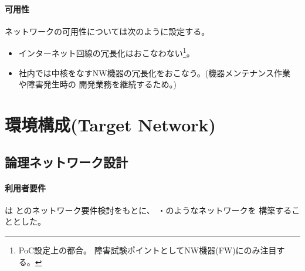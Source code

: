     \paragraph{可用性}

ネットワークの可用性については次のように設定する。
\begin{itemize}
 \item インターネット回線の冗長化はおこなわない\footnote{PoC設定上の都合。
       障害試験ポイントとしてNW機器(FW)にのみ注目する。}。
 \item 社内では中核をなすNW機器の冗長化をおこなう。(機器メンテナンス作業
       や障害発生時の \tj 開発業務を継続するため。)
\end{itemize}

 \section{環境構成(Target Network)}


  \subsection{論理ネットワーク設計}
  \label{sec:logical-nw-design}

  \paragraph{利用者要件}
\tj は \yo とのネットワーク要件検討をもとに、
・のようなネットワークを
構築することとした。

